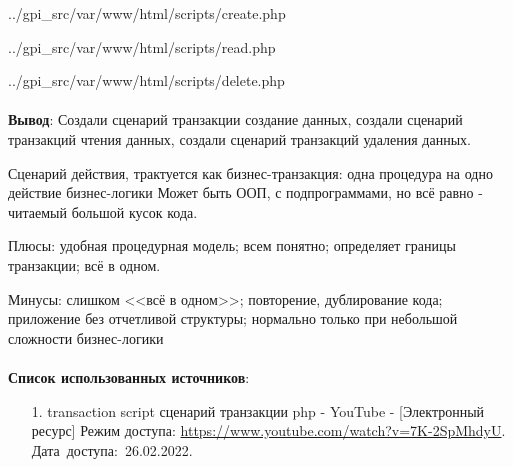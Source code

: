\documentclass[12pt, a4paper, simple]{eskdtext}
\begin{document}
    
        {../gpi_src/var/www/html/scripts/create.php}

    
        {../gpi_src/var/www/html/scripts/read.php}

    
        {../gpi_src/var/www/html/scripts/delete.php}

    \paragraph{} \textbf{Вывод}:
    Создали сценарий транзакции создание данных,
    создали сценарий транзакций чтения данных,
    создали сценарий транзакций удаления данных.

    Сценарий действия, трактуется как бизнес-транзакция: одна процедура на одно действие бизнес-логики
    Может быть ООП, с подпрограммами, но всё равно - читаемый большой кусок кода.

    Плюсы:
    удобная процедурная модель;
    всем понятно;
    определяет границы транзакции;
    всё в одном.

    Минусы:
    слишком <<всё в одном>>;
    повторение, дублирование кода;
    приложение без отчетливой структуры;
    нормально только при небольшой сложности бизнес-логики

    \paragraph{} \textbf{Список использованных источников}:

    \begin{enumerate}
        \item[1.] transaction script сценарий транзакции php - YouTube
        - [Электронный ресурс]
        Режим доступа: \url{https://www.youtube.com/watch?v=7K-2SpMhdyU}.
        Дата~доступа:~26.02.2022.
    \end{enumerate}
    \newpage
\end{document}
